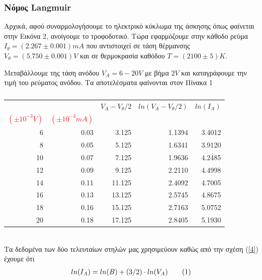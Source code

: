 \documentclass[a4paper]{article}
\newcommand\numberthis{\addtocounter{equation}{1}\tag{\theequation}}
\begin{document}
\subsubsection*{Νόμος Langmuir}
Αρχικά, αφού συναρμολογήσουμε το ηλεκτρικό κύκλωμα της άσκησης όπως φαίνεται στην Εικόνα 2, ανοίγουμε το τροφοδοτικό. Τώρα εφαρμόζουμε στην κάθοδο ρεύμα $I_\theta = (2.267\pm 0.001)mA$ που αντιστοιχεί σε τάση θέρμανσης $V_\theta = (5.750\pm0.001)V$ και σε θερμοκρασία καθόδου $T=(2100\pm5)K$. 

Μεταβάλλουμε της τάση ανόδου $V_A = 6-20 V$ με βήμα $2V$ και καταγράφουμε την τιμή του ρεύματος ανόδου. Τα αποτελέσματα φαίνονται στον Πίνακα 1
\\
\begin{table}[h!]
\centering 
\caption{ }
\begin{tabular}{r|r|r|r|r}
\centering{\textcolor{red}{$V_A$}} & \centering{\textcolor{red}{$I_A$}}& $V_A-V_\theta/2$ & $ln(V_A-V_\theta/2)$& $ln(I_A)$\footnotemark \\ 
\textcolor{red}{$(\pm10^{-3}V)$}  & \textcolor{red}{$(\pm10^{-3}mA)$} &                  &                     &           \\
\hline\hline
6&0.03&3.125&1.1394&3.4012\\ 
8&0.05&5.125&1.6341&3.9120\\ 
10&0.07&7.125&1.9636&4.2485\\ 
12&0.09&9.125&2.2110&4.4998\\ 
14&0.11&11.125&2.4092&4.7005\\ 
16&0.13&13.125&2.5745&4.8675\\ 
18&0.16&15.125&2.7163&5.0752\\ 
20&0.18&17.125&2.8405&5.1930
\end{tabular}
\end{table}
 \\
 Τα δεδομένα των δύο τελευταίων στηλών μας χρησιμεύουν καθώς από την σχέση (\ref{4}) έχουμε ότι 
 \begin{align*}\label{7}
 ln(I_A) = ln(B) + (3/2) \cdot  ln(V_A) \numberthis 
 \end{align*}
\end{document}
